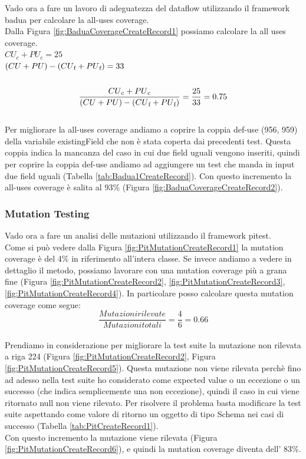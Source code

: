 \documentclass[12pt, a4paper]{article}
\begin{document}
Vado ora a fare un lavoro di adeguatezza del dataflow utilizzando il framework badua per calcolare la all-uses coverage. \\
Dalla Figura \ref{fig:BaduaCoverageCreateRecord1} possiamo calcolare la all uses coverage. \\
\(CU_c + PU_c = 25\) \\
\( (CU + PU) - (CU\textsubscript{f} + PU\textsubscript{f}) = 33\) \\ \\
\[\frac{{CU\textsubscript{c} + PU\textsubscript{c}}}{{(CU + PU) - (CU\textsubscript{f} + PU\textsubscript{f})}} = \frac{{25}}{{33}} = 0.75\] \\ 
Per migliorare la all-uses coverage andiamo a coprire la coppia def-use (956, 959) della variabile existingField che non 
è stata coperta dai precedenti test. Questa coppia indica la mancanza del caso in cui due field uguali vengono inseriti, 
quindi per coprire la coppia def-use andiamo ad aggiungere un test che manda in input due field uguali 
(Tabella \ref{tab:Badua1CreateRecord}).
Con questo incremento la all-uses coverage è salita al 93\% (Figura \ref{fig:BaduaCoverageCreateRecord2}).
\subsubsection{Mutation Testing}

Vado ora a fare un analisi delle mutazioni utilizzando il framework pitest. \\
Come si può vedere dalla Figura \ref{fig:PitMutationCreateRecord1} la mutation coverage è del 4\% in riferimento 
all'intera classe. Se invece andiamo a vedere in dettaglio il metodo, possiamo lavorare con una mutation coverage 
più a grana fine (Figura \ref{fig:PitMutationCreateRecord2}, \ref{fig:PitMutationCreateRecord3}, \ref{fig:PitMutationCreateRecord4}).
In particolare posso calcolare questa mutation coverage come segue:
\[\frac{{Mutazioni rilevate}}{{Mutazioni totali}} = \frac{{4}}{{6}} = 0.66\] \\
Prendiamo in considerazione per migliorare la test suite la mutazione non rilevata a riga 224 
(Figura \ref{fig:PitMutationCreateRecord2}, Figura \ref{fig:PitMutationCreateRecord5}).
Questa mutazione non viene rilevata perchè fino ad adesso nella test suite ho considerato come expected value o un eccezione
o un successo (che indica semplicemente una non eccezione), quindi il caso in cui viene ritornato null non viene rilevato.
Per risolvere il problema basta modificare la test suite aspettando come valore di ritorno un oggetto di tipo Schema nei casi 
di successo (Tabella \ref{tab:PitCreateRecord1}). \\
Con questo incremento la mutazione viene rilevata (Figura \ref{fig:PitMutationCreateRecord6}), e quindi 
la mutation coverage diventa dell' 83\%. 
\end{document}
